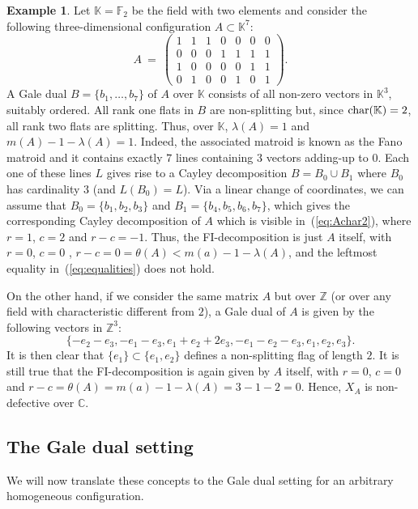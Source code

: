 \documentclass[11pt]{amsart}
\theoremstyle{plain}
\theoremstyle{definition}
\newtheorem{example}[theorem]{Example}
\theoremstyle{remark}
\newcommand{\baseRing}[1]{\ensuremath{\mathbb{#1}}}
\newcommand{\Z}{\baseRing{Z}}
\newcommand{\C}{\baseRing{C}}
\newcommand{\beq}{\begin{equation}}
\newcommand{\eeq}{\end{equation}}
\renewcommand{\k}{{\mathbb K}}
\numberwithin{equation}{section}
\begin{document}
\begin{example}\label{ex:char2}
Let $\k={\mathbb F}_2$ be the field with two elements and consider the following  three-dimensional configuration $A \subset \k^7$:
\beq\label{eq:Achar2}
A \ =\ \left(\begin{array}{ccccccc}1 & 1 & 1 & 0 & 0 & 0 & 0 \\0 & 0 & 0 & 1 & 1 & 1 & 1 \\1 & 0 & 0 & 0 & 0 & 1 & 1 \\0 & 1 & 0 & 0 & 1 & 0 & 1\end{array}\right).
\eeq
A Gale dual $B = \{b_1, \dots, b_7\}$ of $A$ over $\k$
consists of all non-zero vectors in $\k^3$, suitably ordered.
All rank one flats in $B$ are non-splitting but, since ${\rm {char}}(\k) = 2$, all rank two flats are splitting. 
Thus, over $\k$,  $\lambda(A) =1$ and $m(A) - 1 - \lambda(A) = 1$.
Indeed, the associated matroid is known as the Fano matroid and it contains exactly $7$ lines containing $3$ vectors adding-up to $0$. 
Each one of these lines $L$ gives rise to a Cayley decomposition $B= B_0\cup B_1$ where $B_0$ has cardinality $3$ (and $L(B_0)=L$).  Via a linear change of coordinates, we can assume that 
 $B_0 = \{ b_1, b_2,b_3\}$ and $ B_1 =\{b_4, b_5,b_6, b_7\}$, which gives the corresponding Cayley decomposition of $A$ which is visible in~(\ref{eq:Achar2}), where $r=1$, $c=2$ and  $r-c=-1$. Thus, the FI-decomposition is just
$A$ itself, with $r=0$, $c=0$ , $r-c=0 = \theta(A) < m(a) -1 - \lambda(A)$, and the leftmost equality in~(\ref{eq:equalities}) does not hold.

On the other hand, if we consider the same matrix $A$ but over $\Z$  (or over any field with characteristic different from $2$), a Gale dual of $A$ is given by the following vectors in $\Z^3$:
$$\{-e_2-e_3, -e_1-e_3, e_1+e_2+2e_3, -e_1-e_2-e_3, e_1, e_2, e_3\}.$$
It is then clear that $\{e_1\} \subset \{e_1,e_2\}$ defines a non-splitting flag of length $2$. It is still true that
 the FI-decomposition is again given by
$A$ itself, with $r=0$, $c=0$ and $r-c= \theta(A) = m(a) -1 - \lambda(A) = 3-1-2 =0$. Hence, $X_A$ is non-defective over $\C$.
\end{example}


\medskip

\subsection{\bf{The Gale dual setting}} \label{ssec:Gale}

We will now translate these concepts to the Gale dual setting for an arbitrary homogeneous configuration. 
\end{document}
